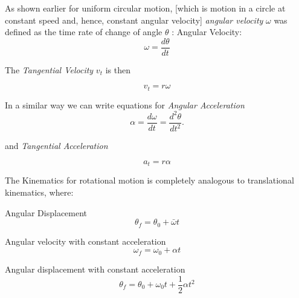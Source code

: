 \documentclass[12pt, letterpaper, twoside]{article}
\begin{document}
As shown earlier for uniform circular motion, [which is motion in a circle at constant speed and, hence, constant angular velocity] \emph{angular velocity}  $\omega$  was defined as the time rate of change of angle $\theta$ :
Angular Velocity:
\begin{equation}
\omega = \frac{d \theta}{dt}
\end{equation}


\bigskip

The \emph{Tangential Velocity} $v_t$ is then 

\begin{equation}
v_t = r \omega
\end{equation}



\bigskip

\begin{center}
\end{center}
\bigskip


In a similar way we can write equations for \emph{Angular Acceleration}
\begin{equation}
\alpha =\frac{d \omega}{dt} = \frac{d^2 \theta}{d t^2}.
\end{equation}


 and \emph{Tangential Acceleration}

\begin{equation}
a_t = r \alpha
\end{equation}


\bigskip

The Kinematics for rotational motion is completely analogous to translational kinematics, where:

Angular Displacement
\begin{equation}
\theta_f = \theta_0 + \bar{\omega} t
\end{equation}



Angular velocity with constant acceleration
\begin{equation}
\omega_f = \omega_0 + \alpha t
\end{equation}



Angular displacement with constant acceleration
\begin{equation}
\theta_f = \theta_0 + \omega_0 t + \frac{1}{2} \alpha t^2 
\end{equation}
\end{document}

